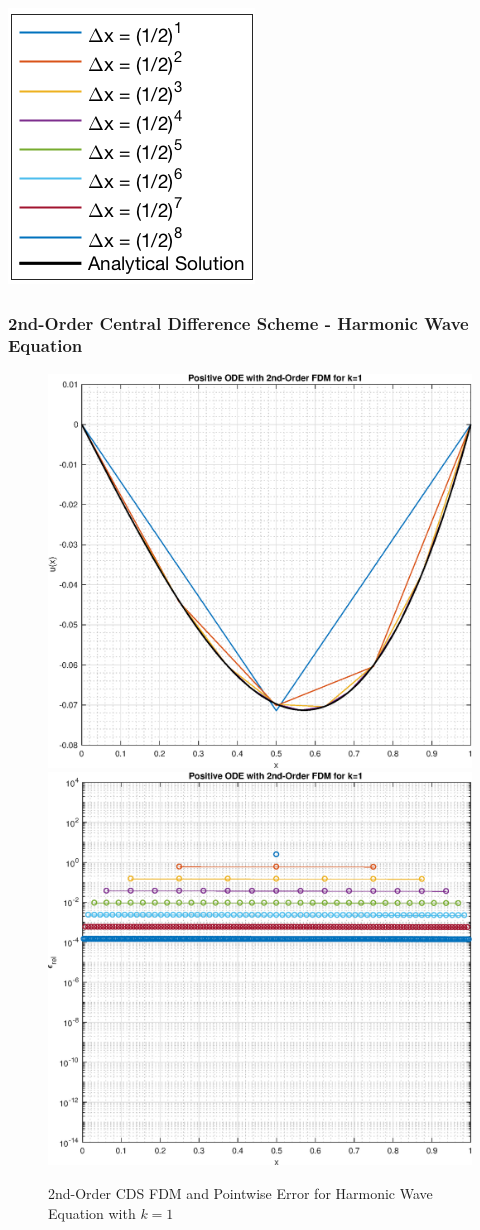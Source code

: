 \documentclass[10pt]{article}		%
\numberwithin{equation}{section}
\begin{document}
\begin{center}
	\includegraphics[height = 0.19\linewidth]{legend}
\end{center}

\newpage

\subsubsection{2nd-Order Central Difference Scheme - Harmonic Wave Equation}

\begin{figure}[H]
	\begin{center}
		\includegraphics[width = 0.31\linewidth]{positive_ode_order_2_k_1}
		\includegraphics[width = 0.31\linewidth]{error_positive_ode_order_2_k_1}
		\caption{2nd-Order CDS FDM and Pointwise Error for Harmonic Wave Equation with $k = 1$}
	\end{center}
\end{figure}
\end{document}
